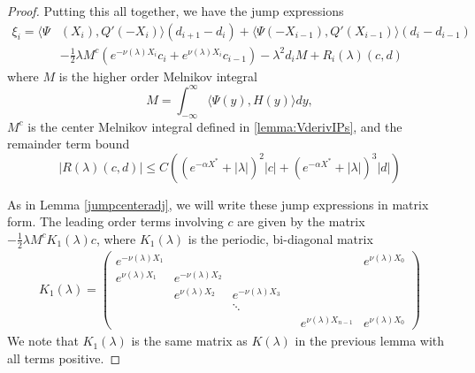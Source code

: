 \documentclass[thesis.tex]{subfiles}
\begin{document}
\begin{lemma}
\begin{proof}
Putting this all together, we have the jump expressions
\begin{align*}
\xi_i = \langle \Psi&(X_i), Q'(-X_i) \rangle (d_{i+1} - d_i ) + \langle \Psi(-X_{i-1}), Q'(X_{i-1}) \rangle (d_i - d_{i-1} ) \\
&-\frac{1}{2}\lambda M^c\left( e^{-\nu(\lambda)X_i}c_i + e^{\nu(\lambda)X_i}c_{i-1}\right)
- \lambda^2 d_i M + R_i(\lambda)(c, d)
\end{align*}
where $M$ is the higher order Melnikov integral
\[
M = \int_{-\infty}^\infty \langle \Psi(y), H(y) \rangle dy,
\]
$M^c$ is the center Melnikov integral defined in \cref{lemma:VderivIPs}, and the remainder term bound
\begin{equation}\label{noncenterR}
|R(\lambda)(c, d)| \leq C \left( (e^{-\alpha X^*} + |\lambda|)^2 |c| + (e^{-\alpha X^*} + |\lambda|)^3 |d| \right)
\end{equation}

As in Lemma \ref{jumpcenteradj}, we will write these jump expressions in matrix form. The leading order terms involving $c$ are given by the matrix $-\frac{1}{2}\lambda M^c K_1(\lambda)c$, where $K_1(\lambda)$ is the periodic, bi-diagonal matrix
\begin{align*}
K_1(\lambda) =  
\begin{pmatrix}
e^{-\nu(\lambda)X_1} & & & & & e^{\nu(\lambda)X_0} \\
e^{\nu(\lambda)X_1} & e^{-\nu(\lambda)X_2} \\
& e^{\nu(\lambda)X_2} & e^{-\nu(\lambda)X_3} \\
 & & \ddots & &&   \\
& & & & e^{\nu(\lambda)X_{n-1}} & e^{\nu(\lambda)X_0}
\end{pmatrix}
\end{align*}
We note that $K_1(\lambda)$ is the same matrix as $K(\lambda)$ in the previous lemma with all terms positive.


\end{proof}
\end{lemma}
\end{document}
